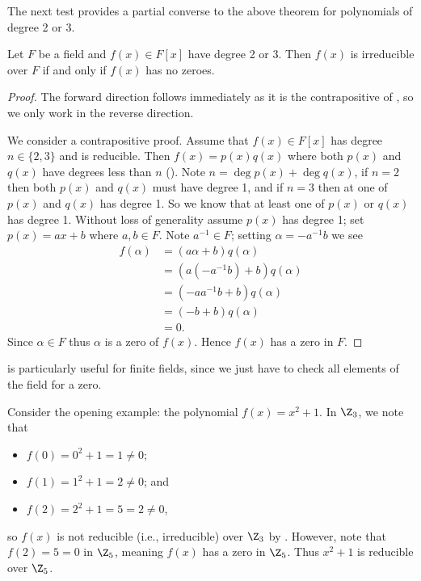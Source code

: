 The next test provides a partial converse to the above theorem for polynomials of degree 2 or 3.
\begin{theorem}\label{thrm-degree-2-or-3-irreducible-iff-has-no-zeroes}
    Let $F$ be a field and $f(x) \in F[x]$ have degree 2 or 3. Then $f(x)$ is irreducible over $F$ if and only if $f(x)$ has no zeroes.
\end{theorem}
\begin{proof}
    The forward direction follows immediately as it is the contrapositive of , so we only work in the reverse direction.

    We consider a contrapositive proof. Assume that $f(x) \in F[x]$ has degree $n \in \{2, 3\}$ and is reducible. Then $f(x) = p(x)q(x)$ where both $p(x)$ and $q(x)$ have degrees less than $n$ (). Note $n = \deg p(x) + \deg q(x)$, if $n = 2$ then both $p(x)$ and $q(x)$ must have degree 1, and if $n = 3$ then at one of $p(x)$ and $q(x)$ has degree 1. So we know that at least one of $p(x)$ or $q(x)$ has degree 1. Without loss of generality assume $p(x)$ has degree 1; set $p(x) = ax + b$ where $a,b \in F$. Note $a^{-1} \in F$; setting $\alpha = -a^{-1}b$ we see
    \begin{align*}
        f(\alpha) &= (a\alpha+b)q(\alpha)\\
        &= \left(a\left(-a^{-1}b\right) + b\right)q(\alpha)\\
        &= \left(-aa^{-1}b + b\right)q(\alpha)\\
        &= (-b+b)q(\alpha)\\
        &= 0.
    \end{align*}
    Since $\alpha \in F$ thus $\alpha$ is a zero of $f(x)$. Hence $f(x)$ has a zero in $F$.
\end{proof}

 is particularly useful for finite fields, since we just have to check all elements of the field for a zero.

\begin{example}
    Consider the opening example: the polynomial $f(x) = x^2 + 1$. In $\Z_3$, we note that
    \begin{itemize}
        \item $f(0) = 0^2 + 1 = 1 \neq 0$;
        \item $f(1) = 1^2 + 1 = 2 \neq 0$; and
        \item $f(2) = 2^2 + 1 = 5 = 2 \neq 0$,
    \end{itemize}
    so $f(x)$ is not reducible (i.e., irreducible) over $\Z_3$ by . However, note that $f(2) = 5 = 0$ in $\Z_5$, meaning $f(x)$ has a zero in $\Z_5$. Thus $x^2 + 1$ is reducible over $\Z_5$.
\end{example}

